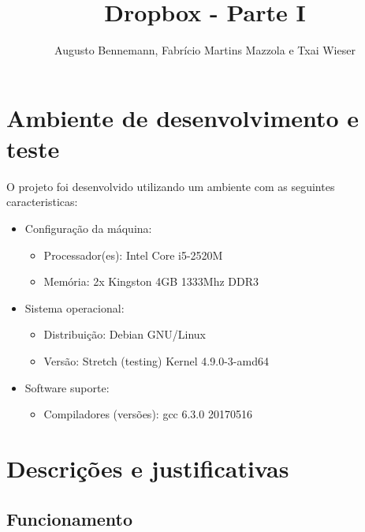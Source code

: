 \documentclass[a4paper]{article}
\title{Dropbox - Parte I}
\author{Augusto Bennemann, Fabrício Martins Mazzola e Txai Wieser}
\date{}
\begin{document}
\maketitle


\section{Ambiente de desenvolvimento e teste}

O projeto foi desenvolvido utilizando um ambiente com as seguintes caracteristicas:
\begin{itemize}
	\item Configuração da máquina:
	\begin{itemize}
		\item Processador(es): Intel Core i5-2520M
		\item Memória: 2x Kingston 4GB 1333Mhz DDR3
	\end{itemize}

	\item{Sistema operacional}: 
	\begin{itemize}
		\item Distribuição: Debian GNU/Linux 
		\item Versão: Stretch (testing) Kernel 4.9.0-3-amd64
	\end{itemize}

	\item Software suporte:
	\begin{itemize}
		\item Compiladores (versões): gcc 6.3.0 20170516
	\end{itemize}
\end{itemize}

\section{Descrições e justificativas}

\subsection{Funcionamento}
\end{document}
